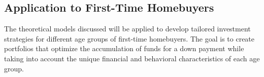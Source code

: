 \subsection{Application to First-Time Homebuyers}
The theoretical models discussed will be applied to develop tailored investment strategies for different age groups of first-time homebuyers. The goal is to create portfolios that optimize the accumulation of funds for a down payment while taking into account the unique financial and behavioral characteristics of each age group.
